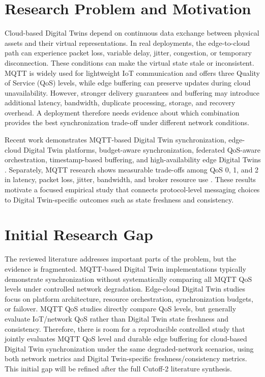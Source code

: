 \section{Research Problem and Motivation}
Cloud-based Digital Twins depend on continuous data exchange between physical assets and their virtual representations. In real deployments, the edge-to-cloud path can experience packet loss, variable delay, jitter, congestion, or temporary disconnection. These conditions can make the virtual state stale or inconsistent. MQTT is widely used for lightweight IoT communication and offers three Quality of Service (QoS) levels, while edge buffering can preserve updates during cloud unavailability. However, stronger delivery guarantees and buffering may introduce additional latency, bandwidth, duplicate processing, storage, and recovery overhead. A deployment therefore needs evidence about which combination provides the best synchronization trade-off under different network conditions.

Recent work demonstrates MQTT-based Digital Twin synchronization, edge-cloud Digital Twin platforms, budget-aware synchronization, federated QoS-aware orchestration, timestamp-based buffering, and high-availability edge Digital Twins \cite{cho2024digital,crespoaguado2024hyperdistributed,li2025budget,narayana2025qos,saday2025synchronization,neagu2026digital}. Separately, MQTT research shows measurable trade-offs among QoS 0, 1, and 2 in latency, packet loss, jitter, bandwidth, and broker resource use \cite{savchenko2026mqtt}. These results motivate a focused empirical study that connects protocol-level messaging choices to Digital Twin-specific outcomes such as state freshness and consistency.

\section{Initial Research Gap}
The reviewed literature addresses important parts of the problem, but the evidence is fragmented. MQTT-based Digital Twin implementations typically demonstrate synchronization without systematically comparing all MQTT QoS levels under controlled network degradation. Edge-cloud Digital Twin studies focus on platform architecture, resource orchestration, synchronization budgets, or failover. MQTT QoS studies directly compare QoS levels, but generally evaluate IoT/network QoS rather than Digital Twin state freshness and consistency. Therefore, there is room for a reproducible controlled study that jointly evaluates MQTT QoS level and durable edge buffering for cloud-based Digital Twin synchronization under the same degraded-network scenarios, using both network metrics and Digital Twin-specific freshness/consistency metrics. This initial gap will be refined after the full Cutoff-2 literature synthesis.


